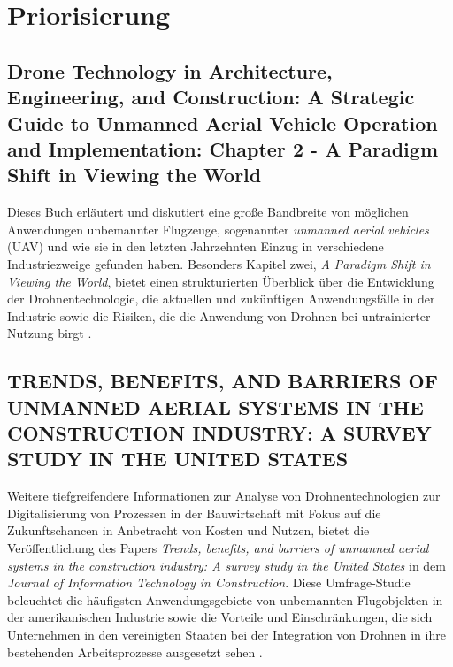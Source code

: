 \chapter{Priorisierung}\label{ch:priorisation}

\section{Drone Technology in Architecture, Engineering, and Construction: A Strategic Guide to Unmanned Aerial Vehicle Operation and Implementation: Chapter 2 - A Paradigm Shift in Viewing the World}

Dieses Buch erläutert und diskutiert eine große Bandbreite von möglichen Anwendungen unbemannter Flugzeuge, sogenannter \textit{unmanned aerial vehicles} (UAV) und wie sie in den letzten Jahrzehnten Einzug in verschiedene Industriezweige gefunden haben.
Besonders Kapitel zwei, \textit{A Paradigm Shift in Viewing the World}, bietet einen strukturierten Überblick über die Entwicklung der Drohnentechnologie, die aktuellen und zukünftigen Anwendungsfälle in der Industrie sowie die Risiken, die die Anwendung von Drohnen bei untrainierter Nutzung birgt \cite{Tal2021}.

\section{TRENDS, BENEFITS, AND BARRIERS OF UNMANNED AERIAL SYSTEMS IN THE CONSTRUCTION INDUSTRY: A SURVEY STUDY IN THE UNITED STATES}

Weitere tiefgreifendere Informationen zur Analyse von Drohnentechnologien zur Digitalisierung von Prozessen in der Bauwirtschaft mit Fokus auf die Zukunftschancen in Anbetracht von Kosten und Nutzen, bietet die Veröffentlichung des Papers \textit{Trends, benefits, and barriers of unmanned aerial systems in the construction industry: A survey study in the United States} in dem \textit{Journal of Information Technology in Construction}.
Diese Umfrage-Studie beleuchtet die häufigsten Anwendungsgebiete von unbemannten Flugobjekten in der amerikanischen Industrie sowie die Vorteile und Einschränkungen, die sich Unternehmen in den vereinigten Staaten bei der Integration von Drohnen in ihre bestehenden Arbeitsprozesse ausgesetzt sehen \cite{abaeano2021trends}.